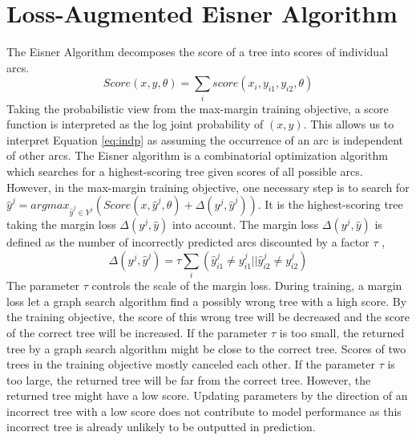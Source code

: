 \section{Loss-Augmented Eisner Algorithm}
\label{sec:Loss-Augmented Eisner Algorithm}
The Eisner Algorithm decomposes the score of a tree into scores of individual arcs. 
\begin{equation}
\label{eq:indp}
Score(x,y,\theta)=\sum_i score(x_i,y_{i1},y_{i2},\theta)
\end{equation}
Taking the probabilistic view from the max-margin training objective, a score function is interpreted as the log joint probability of $(x,y)$. This allows us to interpret Equation \ref{eq:indp} as assuming the occurrence of an arc is independent of other arcs. The Eisner algorithm is a combinatorial optimization algorithm which searches for a highest-scoring tree given scores of all possible arcs. However, in the max-margin training objective, one necessary step is to search for $\hat{y}^j = arg max_{\hat{y}^j\in Y^j}(Score(x,\hat{y}^j,\theta)+\Delta(y^j,\hat{y}^j))$. It is the highest-scoring tree taking the margin loss $\Delta(y^j,\hat{y})$ into account. The margin loss $\Delta(y^j,\hat{y})$ is defined as the number of incorrectly predicted arcs discounted by a factor $\tau$ \cite{pei2015} \cite{kiperwasser2016simple},
\begin{equation}
\label{eq:delta}
\Delta(y^j,\hat{y}^j)=\tau \sum_i (\hat{y}_{i1}^j\neq y_{i1}^j|| \hat{y}_{i2}^j\neq y_{i2}^j)
\end{equation} 
The parameter $\tau$ controls the scale of the margin loss. During training, a margin loss let a graph search algorithm find a possibly wrong tree with a high score. By the training objective, the score of this wrong tree will be decreased and the score of the correct tree will be increased. If the parameter $\tau$ is too small, the returned tree by a graph search algorithm might be close to the correct tree. Scores of two trees in the training objective mostly canceled each other. If the parameter $\tau$ is too large, the returned tree will be far from the correct tree. However, the returned tree might have a low score. Updating parameters by the direction of an incorrect tree with a low score does not contribute to model performance as this incorrect tree is already unlikely to be outputted in prediction.

